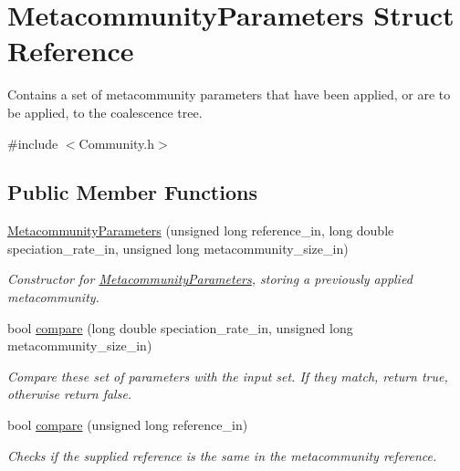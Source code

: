 \hypertarget{struct_metacommunity_parameters}{}\section{Metacommunity\+Parameters Struct Reference}
\label{struct_metacommunity_parameters}


Contains a set of metacommunity parameters that have been applied, or are to be applied, to the coalescence tree.  




{\ttfamily \#include $<$Community.\+h$>$}

\subsection*{Public Member Functions}
\begin{DoxyCompactItemize}
\item 
\hyperlink{struct_metacommunity_parameters_af6bab418342254503030c3fc6390420e}{Metacommunity\+Parameters} (unsigned long reference\+\_\+in, long double speciation\+\_\+rate\+\_\+in, unsigned long metacommunity\+\_\+size\+\_\+in)
\begin{DoxyCompactList}\small\item\em Constructor for \hyperlink{struct_metacommunity_parameters}{Metacommunity\+Parameters}, storing a previously applied metacommunity. \end{DoxyCompactList}\item 
bool \hyperlink{struct_metacommunity_parameters_a5f0c670813ba6a1e34d05e7eba782251}{compare} (long double speciation\+\_\+rate\+\_\+in, unsigned long metacommunity\+\_\+size\+\_\+in)
\begin{DoxyCompactList}\small\item\em Compare these set of parameters with the input set. If they match, return true, otherwise return false. \end{DoxyCompactList}\item 
bool \hyperlink{struct_metacommunity_parameters_a5b8597643984dd783a4275d93ce0b7cb}{compare} (unsigned long reference\+\_\+in)
\begin{DoxyCompactList}\small\item\em Checks if the supplied reference is the same in the metacommunity reference. \end{DoxyCompactList}\end{DoxyCompactItemize}

